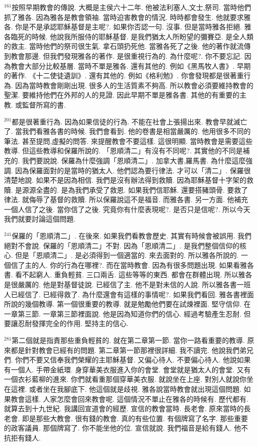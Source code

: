 \documentclass{book}
\begin{document}
$^{161}$按照早期教會的傳說.
大概是主侯六十二年.
他被法利塞人,文士,祭司.
當時他們抓了雅各.
因為雅各是教會領袖.
當時迫害教會的情況.
時時都會發生.
他就要求雅各.
你是不是承認耶穌基督是主呢?.
如果你否認一句.
沒事.
但是當時雅各拒絕.
雅各臨死的時候.
他說我所服侍的耶穌基督.
是我們猶太人所盼望的彌賽亞.
是全人類的救主.
當時他們的祭司很生氣.
拿石頭扔死他.
當雅各死了之後.
他的著作就流傳到教會那邊.
但我們發現雅各的著作.
是很重視行為的.
為什麼呢?.
你不要忘記.
因為教會大部分比較基層.
當時不單是雅各.
還有其他的.
例如《黑馬牧人書》.
早期的著作.
《十二使徒遺訓》.
還有其他的.
例如《格利勉》.
你會發現都是很著重行為.
因為當時教會剛剛出現.
很多人的生活質素不夠高.
所以教會必須要維持教會的聖潔.
要維持他們在外邦的人的見證.
因此早期不單是雅各書.
其他的有重要的主教.
或監督所寫的書.

$^{201}$都是很著重行為.
因為如果信徒的行為.
不能在社會上張揚出來.
教會早就滅亡了.
當我們看雅各書的時候.
我們會看到.
他的卷書是相當嚴厲的.
他用很多不同的筆法.
甚至提問,虛擬的問答.
來提醒教會不要這樣.
這很明顯.
當時教會是需要這些教導.
但這些教導和保羅所說的.
「恩順清二」有沒有不同呢?.
其實他的不同是補充的.
我們要說說.
保羅為什麼強調「恩順清二」.
加拿大書,羅馬書.
為什麼這麼強調.
因為保羅面對的是當時的猶太人.
他們認為要行律法.
才可以「清二」.
保羅很清楚地說.
如果不是因為相信.
我們是沒有辦法得到救贖.
因為耶穌基督十字架的救贖.
是源源全盡的.
是為我們承受了救恩.
如果我們信耶穌.
還要搭豬頭骨.
要救了律法.
就侮辱了基督的救贖.
所以保羅說這不是福音.
而雅各書.
另一方面.
他補充一個人信了之後.
當你信了之後.
究竟你有什麼表現呢?.
是否只是信呢?.
所以今天我們就要討論這個問題.

$^{241}$保羅的「恩順清二」.
在後來.
如果我們看教會歷史.
其實有時候會被誤用.
我們絕對不會說.
保羅的「恩順清二」不對.
因為「恩順清二」.
是我們整個信仰的核心.
但是「恩順清二」.
是必須得到一個適當的.
來去面對的.
所以雅各所說的.
一個信了主的人.
你的行為在哪裡?.
而在當時教會.
因為有很多問題出現.
如果看雅各書.
看不起窮人.
重負輕貧.
三口兩舌.
這些等等的東西.
都會在群體出現.
所以雅各是很嚴厲的.
他是對基督徒說.
已經信了主.
他不是對未信的人說.
所以雅各書一班人已經信了.
已經得救了.
為什麼還會有這樣的事情呢?.
如果我們看回.
雅各書裡面所說的幾個教導.
第一個很重要的教導.
就是勉勵他們要在試煉裡面.
堅守信仰.
在一章第三節.
一章第三節裡面說.
他是因為知道你們的信心.
經過考驗產生忍耐.
但要讓忍耐發揮完全的作用.
堅持主的信心.

$^{281}$第二個就是指責那些重負輕貧的.
就在第二章第一節.
當你一路看重要的教導.
原來都是針對教會已經有的問題.
第二章第一節那裡很詳細.
我不讀完.
他說我們弟兄們.
你們不要又信奉我們榮耀的主耶穌基督.
又偏心待人.
不要偏心待人.
他說如果有一個人.
手帶金紙環.
身穿華美衣服進入你的會堂.
會堂就是猶太人的會堂.
又有一個衣衫藍柳的進來.
你們就看重那個穿華美衣服.
就說坐在上座.
對別人就說你坐在這裡.
或者坐在我腳底下.
他這個就是歧視.
雅各說當時教會就出現這個問題.
如果教會這樣.
人家怎麼會回來教會呢.
這個情況不單止在雅各的時候有.
歷代都有.
就算去到十九世紀.
我講回宣道會的經歷.
宣信的教會當時.
長老會.
原來當時的長老會.
即是那些大教會.
很有錢的教會.
真的有些位置.
有個牌寫了名字.
那些重要的政客議員.
那個牌寫了.
你不能坐他的位.
宣信就說.
我們福音是給有錢人.
他不抗拒有錢人.
\end{document}
